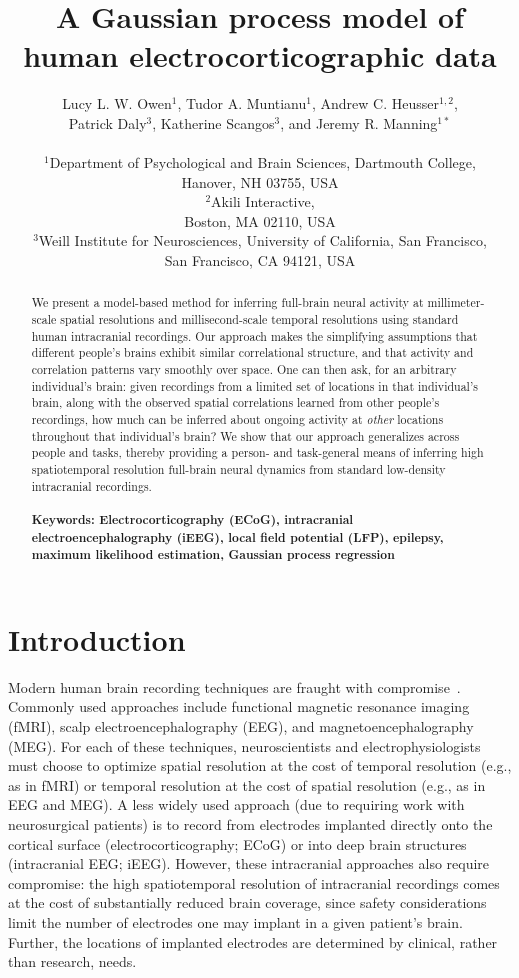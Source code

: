 \documentclass[11pt]{article}
\title{A Gaussian process model of human e\-lect\-ro\-cort\-i\-co\-graph\-ic data}
\author{
  Lucy L. W. Owen$^{1}$,
  Tudor A. Muntianu$^{1}$,
  Andrew C. Heusser$^{1, 2}$, \\
  Patrick Daly$^{3}$,
  Katherine Scangos$^{3}$, and
  Jeremy R. Manning$^{1\ast}$\\\\
$^{1}$Department of Psychological and Brain Sciences, Dartmouth College,\\
Hanover, NH 03755, USA\\
$^{2}$Akili Interactive,\\
Boston, MA 02110, USA\\
$^{3}$Weill Institute for Neurosciences, University of California, San Francisco,\\
San Francisco, CA 94121, USA}
\date{}
\begin{document}
\baselineskip24pt
\maketitle

\begin{abstract}
  We present a model-based method for inferring full-brain neural
  activity at millimeter-scale spatial resolutions and
  millisecond-scale temporal resolutions using standard human
  intracranial recordings.  Our approach makes the simplifying
  assumptions that different people's brains exhibit similar
  correlational structure, and that activity and correlation patterns
  vary smoothly over space.  One can then ask, for an arbitrary
  individual's brain: given recordings from a limited set of locations
  in that individual's brain, along with the observed spatial
  correlations learned from other people's recordings, how much can be
  inferred about ongoing activity at \textit{other} locations
  throughout that individual's brain?  We show that our approach
  generalizes across people and tasks, thereby providing a person- and
  task-general means of inferring high spatiotemporal resolution
  full-brain neural dynamics from standard low-density intracranial
  recordings.
  \\\\
  \footnotesize{\textbf{Keywords: Electrocorticography (ECoG),
      intracranial electroencephalography (iEEG), local field
      potential (LFP), epilepsy, maximum likelihood estimation,
      Gaussian process regression}}
\end{abstract}

\section*{Introduction}
Modern human brain recording techniques are fraught with
compromise~\citep{SejnEtal14}.  Commonly used approaches include
functional magnetic resonance imaging (fMRI), scalp
electroencephalography (EEG), and magnetoencephalography (MEG).  For
each of these techniques, neuroscientists and electrophysiologists
must choose to optimize spatial resolution at the cost of temporal
resolution (e.g., as in fMRI) or temporal resolution at the cost of
spatial resolution (e.g., as in EEG and MEG).  A less widely used
approach (due to requiring work with neurosurgical patients) is to
record from electrodes implanted directly onto the cortical surface
(electrocorticography; ECoG) or into deep brain structures
(intracranial EEG; iEEG).  However, these intracranial approaches also
require compromise: the high spatiotemporal resolution of
intracranial recordings comes at the cost of substantially reduced
brain coverage, since safety considerations limit the number of
electrodes one may implant in a given patient's brain.  Further, the
locations of implanted electrodes are determined by clinical, rather
than research, needs.
\end{document}
